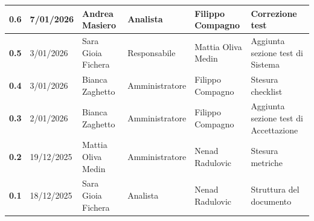 \documentclass[a4paper,12pt]{article}
\begin{document}
\begin{xltabular}{\textwidth}{|l|l|X|l|X|X|}
                \hline
                \textbf{0.6} & 7/01/2026 & Andrea Masiero & Analista & Filippo Compagno & Correzione test \\
                \hline
                \textbf{0.5} & 3/01/2026 & Sara Gioia Fichera & Responsabile & Mattia Oliva Medin & Aggiunta sezione test di Sistema \\
                \hline
                \textbf{0.4} & 3/01/2026 & Bianca Zaghetto & Amministratore & Filippo Compagno & Stesura checklist \\
                \hline
                \textbf{0.3} & 2/01/2026 & Bianca Zaghetto & Amministratore & Filippo Compagno & Aggiunta sezione test di Accettazione \\
                \hline
                \textbf{0.2} & 19/12/2025 & Mattia Oliva Medin & Amministratore & Nenad Radulovic & Stesura metriche\\
                \hline
                \textbf{0.1} & 18/12/2025 & Sara Gioia Fichera & Analista & Nenad Radulovic & Struttura del documento \\
                \hline
    \end{xltabular}
    \newpage
    
    \tableofcontents
    \newpage

    \listoffigures
    \newpage

    \listoftables
    \newpage
    
\end{document}
